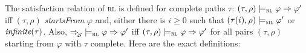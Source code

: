 \documentclass[conference]{IEEEtran}
\renewcommand{\S}{\mathcal{S}}
\newcommand{\tran}[2]{\Ra^{\!#1}_{\!#2}}
\newcommand{\Ra}{\Rightarrow}
\newcommand{\ML}{\textsc{ml}\xspace}
\newcommand{\RL}{\textsc{rl}\xspace}
\newcommand{\rarule}[2]{{#1} \Ra{#2}}
\newcommand{\modelsml}{\models_\ML}
\newcommand{\modelsrl}{\models_\RL}
\newcommand{\coq}[1]{{\small \textit{#1}}}
\newcommand{\coqtt}[1]{{\small \texttt{#1}}}
\newcommand{\cnot}{\pmb{\lnot}}
\newcommand{\cand}{\pmb{\land}}
\newcommand{\cor}{\pmb{\lor}}
\newcommand{\cexists}{\pmb{\exists}}
\newcommand{\cforall}{\pmb{\forall}}
\newcommand{\cimplies}{\pmb{\rightarrow}}
\begin{document}
%


The satisfaction relation of \RL is defined for complete paths $\tau$: $(\tau,\rho)\modelsrl \rarule{\varphi}{\varphi'}$ iff $(\tau,\rho)$ \coq{startsFrom} $\varphi$ and, either there is $i\ge 0$ such that $(\tau(i),\rho)\modelsml\varphi'$ or $\coq{infinite}(\tau)$.
Also, ${\tran{}{\S}}\modelsrl \rarule{\varphi}{\varphi'}$ iff $(\tau,\rho) \modelsrl \rarule{\varphi}{\varphi'}$ for all pairs $(\tau,\rho)$ starting from $\varphi$ with $\tau$ complete. Here are the exact definitions:\\
\end{document}
